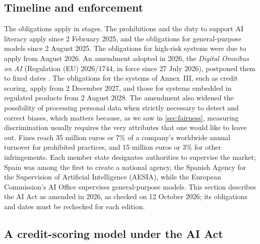 \subsection{Timeline and enforcement}

The obligations apply in stages. The prohibitions and the duty to support AI literacy apply since 2 February 2025, and the
obligations for general-purpose models since 2 August 2025. The obligations for high-risk systems were due to apply from
August 2026. An amendment adopted in 2026, the \emph{Digital Omnibus on AI} (Regulation (EU) 2026/1744, in force since 27 July 2026),
postponed them to fixed dates \citep{eu2026omnibus}. The obligations for the systems of Annex~III, such as credit scoring, apply from 2 December 2027, and those for systems
embedded in regulated products from 2 August 2028. The amendment also widened the possibility of
processing personal data when strictly necessary to detect and correct biases, which matters because, as we saw in
\cref{sec:fairness}, measuring discrimination usually requires the very attributes that one would like to leave out. Fines
reach 35 million euros or 7\% of a company's worldwide annual turnover for prohibited practices, and 15 million euros or 3\% for
other infringements. Each member state designates authorities to supervise the market; Spain was among the first to create a national
agency, the Spanish Agency for the Supervision of Artificial Intelligence (AESIA), while the European Commission's AI Office
supervises general-purpose models. This section describes the AI Act as amended in 2026, as checked on 12 October 2026;
its obligations and dates must be rechecked for each edition.

\subsection{A credit-scoring model under the AI Act}

